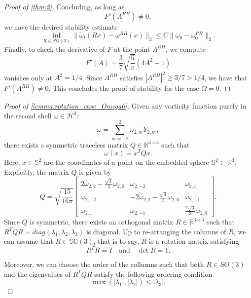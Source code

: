 \documentclass{amsart}
\def\erre{{\mathbb{R}}}
\def\esse{{\mathbb{S}}}
\begin{document}
\begin{proof}[Proof of \cref{thm:2}]
    
    Concluding, as long as 
    $$
        F'(A^{RH})\ne 0,
    $$ 
    we have the desired stability estimate
    $$
        \inf_{R\in SO(3)}\|\tilde\omega_t(Rx)-\omega^{RH}(x)\|_2\leq C\|\omega_0 - \omega_0^{RH}\|_2 .
    $$
    Finally, to check the derivative of $F$ at the point $A^{RH}$, we compute
    \begin{equation*}
        F'(A)=\frac{3}{7}\sqrt{\frac{5}{\pi}}(4A^2-1)
    \end{equation*}
    vanishes only at $A^2=1/4$. Since $A^{RH}$ satisfies $|A^{RH}|^2\ge 3/7>1/4$, we have that $F'(A^{RH})\ne0$. This concludes the proof of stability for the case $\Omega=0$.
\end{proof}

\begin{proof}[Proof of \cref{lemma:rotation_case_Omega0}]
Given any vorticity function purely in the second shell $\omega\in\mathcal{H}^2$:
$$
\omega=\sum_{m=-2}^2\omega_{2,m} Y_{2,m},
$$
there exists a symmetric traceless matrix $Q\in\erre^{3\times3}$ such that
\begin{equation}
    \omega(x)=x^TQx.
    \label{eq:quadratic_form}
\end{equation}
Here, $x\in\esse^2$ are the coordinates of a point on the embedded sphere $\mathbb{S}^2\subset\mathbb{R}^3$. Explicitly, the matrix $Q$ is given by
\begin{equation}
Q=\sqrt{\frac{15}{16\pi}}\begin{bmatrix}
2\omega_{2,2}-\frac{\sqrt{3}}{3}\omega_{2,0} & \omega_{2,-2} & \omega_{2,1} \\
\omega_{2,-2} & -2\omega_{2,2}-\frac{\sqrt{3}}{3}\omega_{2,0} & \omega_{2,-1} \\
\omega_{2,1} & \omega_{2,-1} & \frac{2\sqrt{3}}{3}\omega_{2,0}
\end{bmatrix}.
\label{eq:matrixQ_expl}
\end{equation}
Since $Q$ is symmetric, there exists an orthogonal matrix $R\in\erre^{3\times3}$ such that $R^TQR=diag(\lambda_1,\lambda_2,\lambda_3)$ is diagonal. Up to re-arranging the columns of $R$, we can assume that $R\in\mathbb{SO}(3)$, that is to say, $R$ is a rotation matrix satisfying
\begin{equation*}
    R^T R=I\quad\text{and}\quad\det R=1.
\end{equation*}

Moreover, we can choose the order of the collumns such that both $R\in SO(3)$ and the eigenvalues of $R^TQR$ satisfy the following ordering condition
\begin{equation}
    \max(|\lambda_1|,|\lambda_2|)\leq|\lambda_3|.
    \label{eq:lambda3_max}
\end{equation}



\end{proof}
\end{document}
